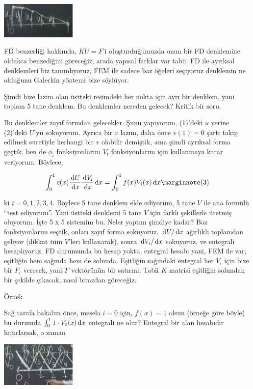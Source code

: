 \documentclass[12pt,fleqn]{article}\usepackage{../../common}
\begin{document}
\includegraphics[width=10em]{compscieng_1_18_04.png}

FD benzerliği hakkında, $KU=F$'i oluşturduğumuzda onun bir FD denklemine oldukca
benzediğini göreceğiz, arada yapısal farklar var tabii, FD ile ayrıksal
denklemleri biz tanımlıyoruz, FEM ile sadece baz öğeleri seçiyoruz denklemin
ne olduğunu Galerkin yöntemi bize söylüyor.

Şimdi bize lazım olan üstteki resimdeki her nokta için ayrı bir denklem, yani
toplam 5 tane denklem. Bu denklemler nereden gelecek? Kritik bir soru.

Bu denklemler zayıf formdan gelecekler. Şunu yapıyorum, (1)'deki $u$ yerine
(2)'deki $U$'yu sokuyorum. Ayrıca bir $v$ lazım, daha önce $v(1)=0$ şartı takip
edilmek suretiyle herhangi bir $v$ olabilir demiştik, ama şimdi ayrıksal forma
geçtik, ben de $\phi_i$ fonksiyonlarını $V_i$ fonksiyonlarım için kullanmaya
karar veriyorum. Böylece,

$$
\int_{0}^{1} c(x) \frac{\ud U}{\ud x} \frac{\ud V_i}{\ud x} \ud x =
\int_{0}^{1} f(x) V_i(x) \ud x
\mlabel{3}
$$

ki $i=0,1,2,3,4$. Böylece 5 tane denklem elde ediyorum, 5 tane $V$ ile ana
formülü ``test ediyorum''. Yani üstteki denklemi 5 tane $V$ için farklı
şekillerle üretmiş oluyorum. İşte 5 x 5 sistemim bu. Neler yaptım şimdiye kadar?
Baz fonksiyonlarını seçtik, onları zayıf forma sokuyoruz. $\,\mathrm{d} U / \,\mathrm{d} x$
ağırlıklı toplamdan geliyor (dikkat tüm $V$'leri kullanarak), sonra
$\,\mathrm{d} V_i / \,\mathrm{d} x$ sokuyoruz, ve entegrali hesaplıyoruz. FD durumunda bu
hesap yoktu, entegral hesabı yani, FEM ile var, eşitliğin hem sağında hem de
solunda.  Eşitliğin sağındaki entegral her $V_i$ için bize bir $F_i$ verecek,
yani $F$ vektörünün bir satırını. Tabii $K$ matrisi eşitliğin solundan
bir şekilde çıkacak, nasıl birazdan göreceğiz.

Örnek

Sağ tarafa bakalım önce, mesela $i=0$ için, $f(x)=1$ olsun (örneğe göre
böyle) bu durumda $\int_{0}^{1} 1 \cdot V_0(x) \,\mathrm{d} x$ entegrali ne
olur? Entegral bir alan hesabıdır hatırlarsak, o zaman 

\includegraphics[width=10em]{compscieng_1_18_05.png}
\end{document}
